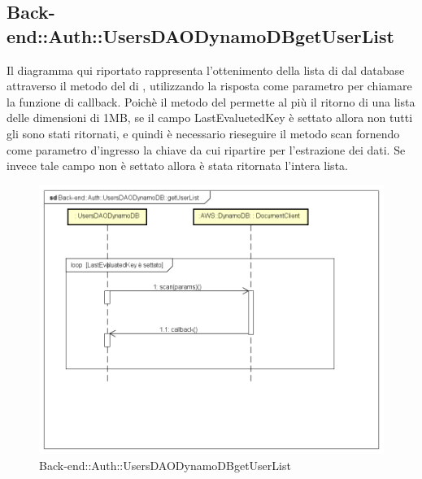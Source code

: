 \subsection{Back-end::Auth::UsersDAODynamoDBgetUserList}
Il diagramma qui riportato rappresenta l'ottenimento della lista di  dal database attraverso il metodo  del  di , utilizzando la risposta come parametro per chiamare la funzione di callback. Poichè il metodo  del  permette al più il ritorno di una lista delle dimensioni di 1MB, se il campo LastEvaluetedKey è settato allora non tutti gli  sono stati ritornati, e quindi è necessario rieseguire il metodo scan fornendo come parametro d'ingresso la chiave da cui ripartire per l'estrazione dei dati. Se invece tale campo non è settato allora è stata ritornata l'intera lista.
\begin{figure}[h] \centering \includegraphics[width=\textwidth,height=\textheight,keepaspectratio]{images/diagrams/back-end/Ufficial_Backend/Back-endAuthUsersDAODynamoDBgetUserList.png} 	\caption{Back-end::Auth::UsersDAODynamoDBgetUserList}
\end{figure}
\newpage

